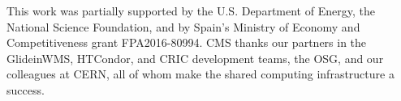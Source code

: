 \documentclass{webofc}
\begin{document}
\begin{acknowledgement}
This work was partially supported by the U.S. Department of Energy, the National Science Foundation, and by Spain’s Ministry of Economy and Competitiveness grant FPA2016-80994. CMS thanks our partners in the GlideinWMS, HTCondor, and CRIC development teams, the OSG, and our colleagues at CERN, all of whom make the shared computing infrastructure a success.
\end{acknowledgement}



%
%
%
%
\end{document}
